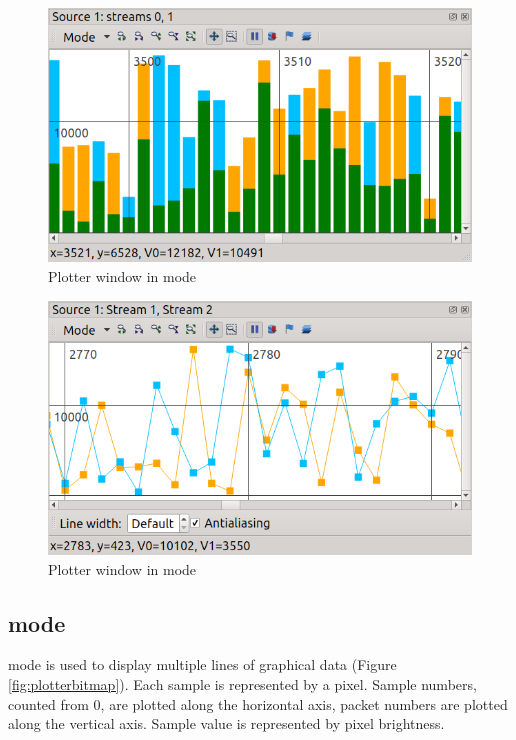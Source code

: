 \documentclass[a4paper,12pt,twoside,extrafontsizes]{memoir}
\begin{document}
\begin{figure}[htbp]
\centering
\includegraphics{images/plotterbars.png}
\caption{Plotter window in  mode}
\label{fig:plotterbars}
\end{figure}

\begin{figure}[htbp]
\centering
\includegraphics{images/plotterplot.png}
\caption{Plotter window in  mode}
\label{fig:plotterplot}
\end{figure}

\subsection{ mode}

 mode is used to display multiple lines of graphical data (Figure \ref{fig:plotterbitmap}). Each sample is represented by a pixel. Sample numbers, counted from 0, are plotted along the horizontal axis, packet numbers are plotted along the vertical axis. Sample value is represented by pixel brightness.
\end{document}
